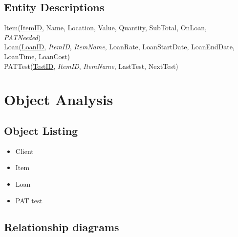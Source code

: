 \documentclass[a4paper,12pt]{report}
\begin{document}
\newpage

\subsection{Entity Descriptions}

Item(\underline{ItemID}, Name, Location, Value, Quantity, SubTotal, OnLoan,\\
\noindent \emph{PATNeeded})\\

\noindent Loan(\underline{LoanID}, \emph{ItemID}, \emph{ItemName}, LoanRate, LoanStartDate, LoanEndDate, LoanTime, LoanCost)\\

\noindent PATTest(\underline{TestID}, \emph{ItemID}, \emph{ItemName}, LastTest, NextTest)

\section{Object Analysis}

\subsection{Object Listing}

\begin{itemize}
    \item Client
    \item Item
    \item Loan
    \item PAT test
\end{itemize}

\subsection{Relationship diagrams}
\end{document}
